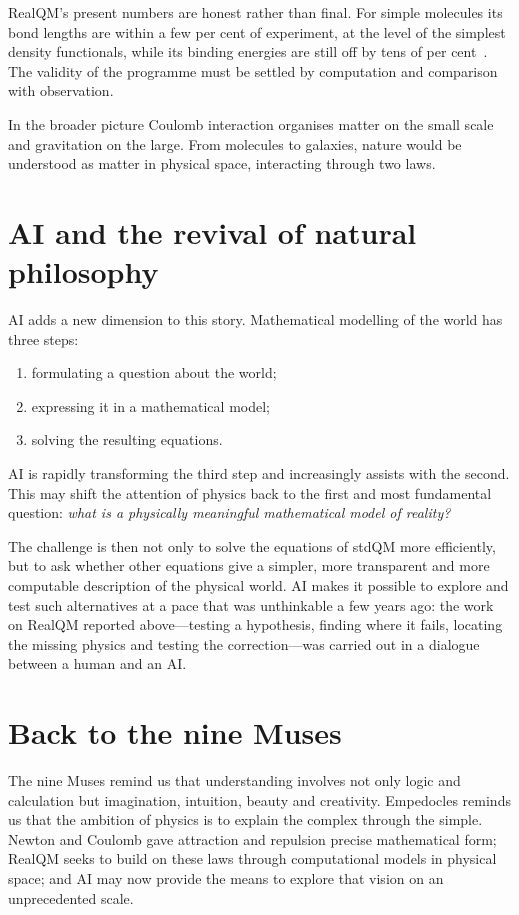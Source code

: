 \documentclass[11pt]{article}
\begin{document}
RealQM's present numbers are honest rather than final. For simple molecules its bond lengths are within
a few per cent of experiment, at the level of the simplest density functionals, while its binding
energies are still off by tens of per cent~\cite{rqmol}. The validity of the programme must be settled by
computation and comparison with observation.

In the broader picture Coulomb interaction organises matter on the small scale and gravitation on the
large. From molecules to galaxies, nature would be understood as matter in physical space, interacting
through two laws.

\section{AI and the revival of natural philosophy}

AI adds a new dimension to this story. Mathematical modelling of the world has three steps:
\begin{enumerate}
\item formulating a question about the world;
\item expressing it in a mathematical model;
\item solving the resulting equations.
\end{enumerate}
AI is rapidly transforming the third step and increasingly assists with the second. This may shift the
attention of physics back to the first and most fundamental question: \emph{what is a physically
meaningful mathematical model of reality?}

The challenge is then not only to solve the equations of stdQM more efficiently, but to ask whether other
equations give a simpler, more transparent and more computable description of the physical world. AI
makes it possible to explore and test such alternatives at a pace that was unthinkable a few years ago:
the work on RealQM reported above---testing a hypothesis, finding where it fails, locating the missing
physics and testing the correction---was carried out in a dialogue between a human and an AI.

\section{Back to the nine Muses}

The nine Muses remind us that understanding involves not only logic and calculation but imagination,
intuition, beauty and creativity. Empedocles reminds us that the ambition of physics is to explain the
complex through the simple. Newton and Coulomb gave attraction and repulsion precise mathematical form;
RealQM seeks to build on these laws through computational models in physical space; and AI may now
provide the means to explore that vision on an unprecedented scale.
\end{document}
